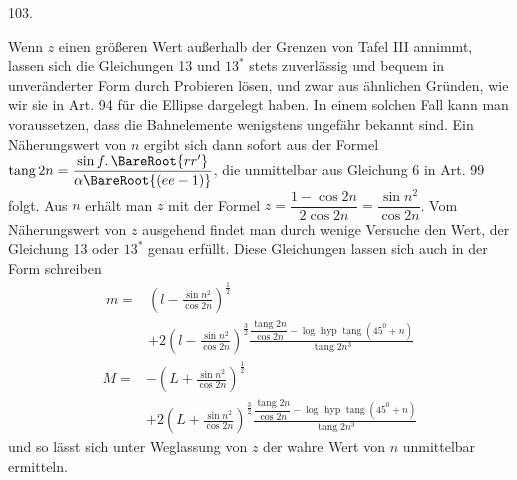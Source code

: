 \par{}\medskip
\hypertarget{native-142-article103}{}
\begin{center}103.\end{center}
Wenn $z$ einen größeren Wert außerhalb der Grenzen von Tafel III annimmt, lassen sich die Gleichungen 13 und $13^*$ stets zuverlässig und bequem in unveränderter Form durch Probieren lösen, und zwar aus ähnlichen Gründen, wie wir sie in Art. 94 für die Ellipse dargelegt haben. In einem solchen Fall kann man voraussetzen, dass die Bahnelemente wenigstens ungefähr bekannt sind. Ein Näherungswert von $n$ ergibt sich dann sofort aus der Formel $\operatorname{tang}2n=\dfrac{\sin f\mathpunct{.}\BareRoot{rr'}}{\alpha\BareRoot{(ee-1)}}$, die unmittelbar aus Gleichung 6 in Art. 99 folgt. Aus $n$ erhält man $z$ mit der Formel $z=\dfrac{1-\cos2n}{2\cos2n}=\dfrac{\sin n^2}{\cos2n}$. Vom Näherungswert von $z$ ausgehend findet man durch wenige Versuche den Wert, der Gleichung 13 oder $13^*$ genau erfüllt. Diese Gleichungen lassen sich auch in der Form schreiben
\[
\begin{aligned}
m={}&\left(l-\frac{\sin n^2}{\cos2n}\right)^{\frac12}\\[.6em]
&+2\left(l-\frac{\sin n^2}{\cos2n}\right)^{\frac32}\frac{\dfrac{\operatorname{tang}2n}{\cos2n}-\log\operatorname{hyp}\operatorname{tang}(45^0+n)}{\operatorname{tang}2n^3}
\end{aligned}
\]
\[
\begin{aligned}
M={}&-\left(L+\frac{\sin n^2}{\cos2n}\right)^{\frac12}\\[.6em]
&+2\left(L+\frac{\sin n^2}{\cos2n}\right)^{\frac32}\frac{\dfrac{\operatorname{tang}2n}{\cos2n}-\log\operatorname{hyp}\operatorname{tang}(45^0+n)}{\operatorname{tang}2n^3}
\end{aligned}
\]
\noindent und so lässt sich unter Weglassung von $z$ der wahre Wert von $n$ unmittelbar ermitteln.
